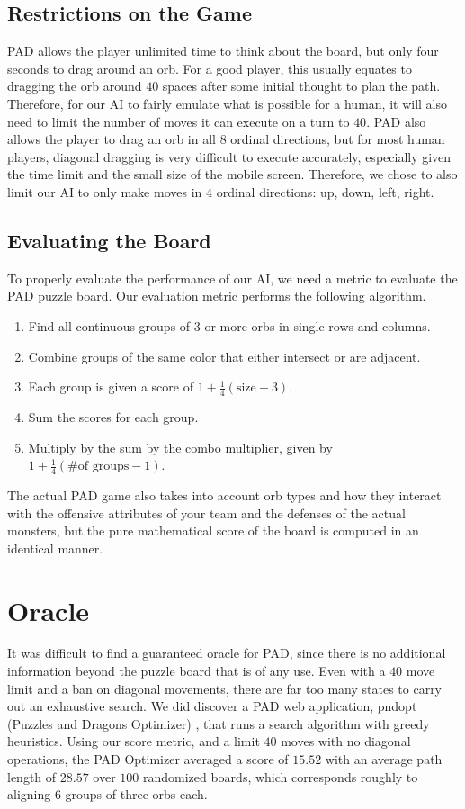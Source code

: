 \documentclass[journal,final,letterpaper,11pt]{IEEEtran}
\begin{document}
\subsection{Restrictions on the Game}
PAD allows the player unlimited time to think about the board, but only four seconds to drag around an orb. For a good player, this usually equates to dragging the orb around $40$ spaces after some initial thought to plan the path. Therefore, for our AI to fairly emulate what is possible for a human, it will also need to limit the number of moves it can execute on a turn to $40$. PAD also allows the player to drag an orb in all $8$ ordinal directions, but for most human players, diagonal dragging is very difficult to execute accurately, especially given the time limit and the small size of the mobile screen. Therefore, we chose to also limit our AI to only make moves in $4$ ordinal directions: up, down, left, right.
\vspace*{-0.1in}
\subsection{Evaluating the Board}
To properly evaluate the performance of our AI, we need a metric to evaluate the PAD puzzle board. Our evaluation metric performs the following algorithm.
\begin{enumerate}
\item Find all continuous groups of 3 or more orbs in single rows and columns.
\item Combine groups of the same color that either intersect or are adjacent.
\item Each group is given a score of $1 + \frac{1}{4}(\mbox{size} - 3)$. \item Sum the scores for each group.
\item Multiply by the sum by the combo multiplier, given by $1 + \frac{1}{4}(\mbox{\# of groups} - 1)$.
\end{enumerate}
The actual PAD game also takes into account orb types and how they interact with the offensive attributes of your team and the defenses of the actual monsters, but the pure mathematical score of the board is computed in an identical manner.

\section{Oracle}
It was difficult to find a guaranteed oracle for PAD, since there is no additional information beyond the puzzle board that is of any use. Even with a $40$ move limit and a ban on diagonal movements, there are far too many states to carry out an exhaustive search. We did discover a PAD web application, pndopt (Puzzles and Dragons Optimizer) \cite{1}, that runs a search algorithm with greedy heuristics. Using our score metric, and a limit $40$ moves with no diagonal operations, the PAD Optimizer averaged a score of $15.52$ with an average path length of $28.57$ over $100$ randomized boards, which corresponds roughly to aligning $6$ groups of three orbs each.
\end{document}
